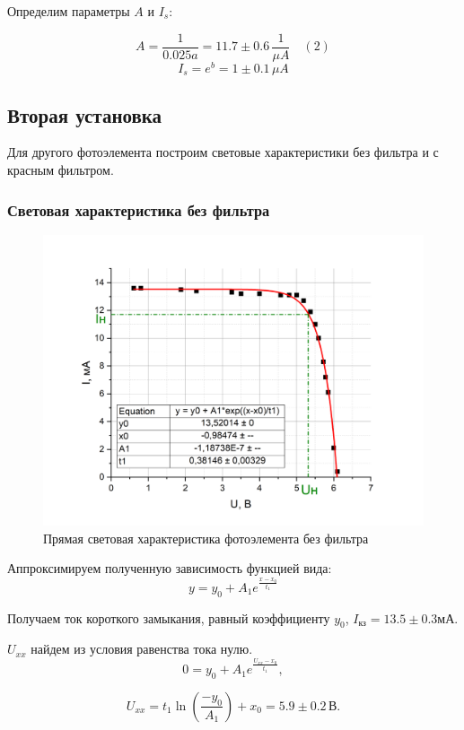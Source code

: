 \documentclass[a4paper,12pt]{article} %
\begin{document}
Определим параметры $A$ и $I_s$:

\[
A = \frac{1}{0.025a} = 11.7 \pm 0.6 \, \frac{1}{\mu A} \quad (2)
\]
\[
I_s = e^b = 1 \pm 0.1 \, \mu A
\]

\subsection{Вторая установка}

Для другого фотоэлемента построим световые характеристики без фильтра и с красным фильтром.

\subsubsection{Световая характеристика без фильтра}

\begin{figure}[h!]
    \centering
    \includegraphics[scale=0.5]{БОЛЬШОЙ Ф-Т прямая световая без фильтра.png}
    \caption{Прямая световая характеристика фотоэлемента без фильтра}
\end{figure}

Аппроксимируем полученную зависимость функцией вида: 
\[
y = y_0 + A_1 e^{\frac{x-x_0}{t_1}}
\]

Получаем ток короткого замыкания, равный коэффициенту $y_0$, $I_{\text{кз}} = 13.5 \pm 0.3 \text{мА}$. 

$U_{xx}$ найдем из условия равенства тока нулю.
\[
0 = y_0 + A_1 e^{\frac{U_{xx}-x_0}{t_1}},
\]

\[
U_{xx} = t_1 \ln\left(\frac{-y_0}{A_1}\right) + x_0 = 5.9 \pm 0.2 \, \text{В}. 
\]
\end{document}
